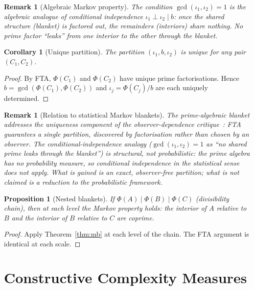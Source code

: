 \documentclass[11pt,a4paper]{article}
\newtheorem{proposition}[theorem]{Proposition}
\newtheorem{corollary}[theorem]{Corollary}
\newtheorem{remark}[theorem]{Remark}
\begin{document}
\begin{remark}[Algebraic Markov property]
The condition $\gcd(\iota_1,\iota_2)=1$ is the algebraic analogue
of conditional independence $\iota_1\perp\iota_2\mid b$: once the
shared structure (blanket) is factored out, the remainders
(interiors) share \emph{nothing}. No prime factor ``leaks'' from one
interior to the other through the blanket.
\end{remark}

\begin{corollary}[Unique partition]
\label{cor:unique}
The partition $(\iota_1,b,\iota_2)$ is unique for any pair
$(C_1,C_2)$.
\end{corollary}

\begin{proof}
By FTA, $\Phi(C_1)$ and $\Phi(C_2)$ have unique prime
factorisations. Hence $b=\gcd(\Phi(C_1),\Phi(C_2))$ and
$\iota_j=\Phi(C_j)/b$ are each uniquely determined.
\end{proof}

\begin{remark}[Relation to statistical Markov blankets]
The prime-algebraic blanket addresses the \emph{uniqueness} component
of the observer-dependence critique~\citep{bruineberg2018}: FTA
guarantees a single partition, discovered by factorisation rather
than chosen by an observer. The conditional-independence analogy
($\gcd(\iota_1,\iota_2)=1$ as ``no shared prime leaks through
the blanket'') is structural, not probabilistic: the prime algebra
has no probability measure, so conditional independence in the
statistical sense does not apply. What is gained is an exact,
observer-free partition; what is not claimed is a reduction to
the probabilistic framework.
\end{remark}

\begin{proposition}[Nested blankets]
\label{prop:nested}
If $\Phi(A)\mid\Phi(B)\mid\Phi(C)$ (divisibility chain), then
at each level the Markov property holds: the interior of $A$
relative to $B$ and the interior of $B$ relative to $C$ are
coprime.
\end{proposition}

\begin{proof}
Apply Theorem~\ref{thm:mb} at each level of the chain. The FTA
argument is identical at each scale.
\end{proof}

\section{Constructive Complexity Measures}
\label{sec:ccm}
\end{document}
